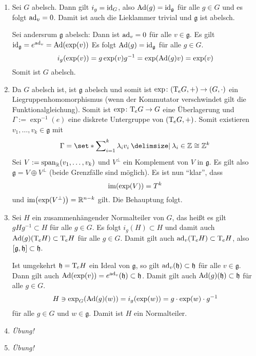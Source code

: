 \begin{beweis}
	\begin{enumerate}[1)]
		\item Sei $G$ abelsch. Dann gilt $i_g=\id_G$, also $\Ad(g) = \id_{\mathfrak{g}}$ für alle $g \in G$ und es folgt $\ad_v=0$. Damit ist auch die Lieklammer trivial und $\mathfrak{g}$ ist abelsch.
		
		Sei andersrum $\mathfrak{g}$ abelsch: Dann ist $\ad_v=0$ für alle $v \in \mathfrak{g}$. Es gilt $\id_{\mathfrak{g}} = e^{\ad_v} = \Ad \enbrace*{\exp(v)}$
		Es folgt $\Ad(g) = \id_{\mathfrak{g}} $ für alle $g \in G$.
		\[
			i_g \enbrace*{\exp(v)} =  g \exp(v) g^{-1} = \exp \enbrace*{\Ad(g)v} = \exp(v)
		\]
		Somit ist $G$ abelsch.
		\item Da $G$ abelsch ist, ist $\mathfrak{g}$ abelsch und somit ist $\exp \colon (\Tmap_eG,+) \to (G,\cdot )$ ein Liegruppenhomomorphismus (wenn der Kommutator verschwindet gilt die Funktionalgleichung).
		Somit ist $\exp \colon \Tmap_e G \to G$ eine Überlagerung und $\Gamma := \exp^{-1}(e)$ eine diskrete Untergruppe von $(\Tmap_e G,+)$.
		Somit existieren $v_1, \ldots, v_k \in \mathfrak{g}$ mit
		\[
			\Gamma = \set*{\sum\nolimits_{i=1}^{k} \lambda_i v_i \given \lambda_i \in \mathbb{Z}} \cong \mathbb{Z}^k
		\]
		Sei $V := \Span_\mathbb{R}(v_1,\ldots ,v_k)$ und $V^\bot$ ein Komplement von $V$ in $\mathfrak{g}$.
		Es gilt also $\mathfrak{g} = V \oplus V^\bot$ (beide Grenzfälle sind möglich).
		Es ist nun \enquote{klar}, dass 
		\[
			\im \enbrace*{\exp(V)} = T^k
		\]
		und $\im \enbrace*{\exp(V^\bot)} = \mathbb{R}^{n-k}$ gilt. 
		Die Behauptung folgt.
		\item Sei $H$ ein zusammenhängender Normalteiler von $G$, das heißt es gilt $g H g^{-1} \subset H$ für alle $g \in G$.
		Es folgt $i_g(H) \subset H$ und damit auch $\Ad(g)(\Tmap_eH) \subset \Tmap_eH$ für alle $g \in G$.
		Damit gilt auch $\ad_v(\Tmap_e H) \subset \Tmap_e H$, also $\benbrace*{\mathfrak{g},\mathfrak{h}}\subset \mathfrak{h}$.
		
		Ist umgekehrt $\mathfrak{h} = \Tmap_e H$ ein Ideal von $\mathfrak{g}$, so gilt $\ad_v(\mathfrak{h}) \subset \mathfrak{h}$ für alle $v \in \mathfrak{g}$.
		Dann gilt auch $\Ad \enbrace*{\exp (v)} = e^{\ad_v}(\mathfrak{h}) \subset \mathfrak{h}$.
		Damit gilt auch $\Ad(g)(\mathfrak{h}) \subset \mathfrak{h}$ für alle $g \in G$.
		\begin{align}
			H \ni \exp_G \enbrace*{\Ad(g)(w)} = i_g \enbrace*{\exp(w)}= g \cdot \exp(w) \cdot g^{-1} 
		\end{align}
		für alle $g \in G$ und $w \in \mathfrak{g}$.
		Damit ist $H$ ein Normalteiler.
		\item \emph{Übung!}
		\item \emph{Übung!}\qedhere
	\end{enumerate}
\end{beweis}

